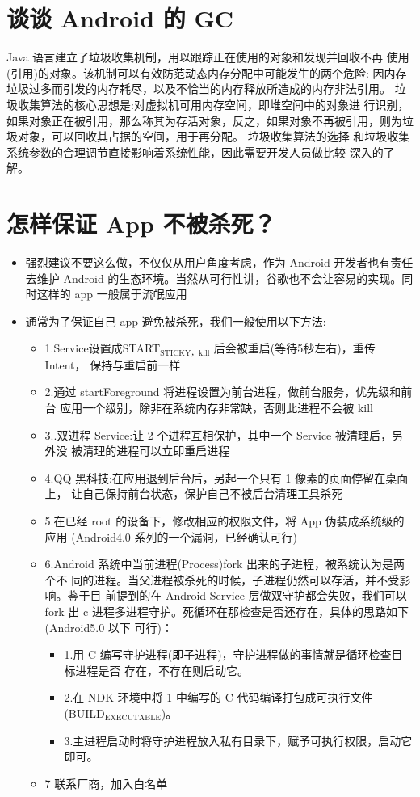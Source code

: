 \documentclass[9pt, b5paper]{article}
\begin{document}
\section{谈谈 Android 的 GC}
\label{sec-13}
Java 语言建立了垃圾收集机制，用以跟踪正在使用的对象和发现并回收不再 使用(引用)的对象。该机制可以有效防范动态内存分配中可能发生的两个危险: 因内存垃圾过多而引发的内存耗尽，以及不恰当的内存释放所造成的内存非法引用。
垃圾收集算法的核心思想是:对虚拟机可用内存空间，即堆空间中的对象进 行识别，如果对象正在被引用，那么称其为存活对象，反之，如果对象不再被引用，则为垃圾对象，可以回收其占据的空间，用于再分配。
垃圾收集算法的选择 和垃圾收集系统参数的合理调节直接影响着系统性能，因此需要开发人员做比较 深入的了解。
\section{怎样保证 App 不被杀死？}
\label{sec-14}
\begin{itemize}
\item 强烈建议不要这么做，不仅仅从用户角度考虑，作为 Android 开发者也有责任去维护 Android 的生态环境。当然从可行性讲，谷歌也不会让容易的实现。同 时这样的 app 一般属于流氓应用
\item 通常为了保证自己 app 避免被杀死，我们一般使用以下方法:
\begin{itemize}
\item 1.Service设置成START$_{\text{STICKY，kill}}$ 后会被重启(等待5秒左右)，重传Intent， 保持与重启前一样
\item 2.通过 startForeground 将进程设置为前台进程，做前台服务，优先级和前台 应用一个级别，除非在系统内存非常缺，否则此进程不会被 kill
\item 3..双进程 Service:让 2 个进程互相保护，其中一个 Service 被清理后，另外没 被清理的进程可以立即重启进程
\item 4.QQ 黑科技:在应用退到后台后，另起一个只有 1 像素的页面停留在桌面上， 让自己保持前台状态，保护自己不被后台清理工具杀死
\item 5.在已经 root 的设备下，修改相应的权限文件，将 App 伪装成系统级的应用 (Android4.0 系列的一个漏洞，已经确认可行)
\item 6.Android 系统中当前进程(Process)fork 出来的子进程，被系统认为是两个不 同的进程。当父进程被杀死的时候，子进程仍然可以存活，并不受影响。鉴于目 前提到的在 Android-Service 层做双守护都会失败，我们可以 fork 出 c 进程多进程守护。死循环在那检查是否还存在，具体的思路如下(Android5.0 以下 可行)：
\begin{itemize}
\item 1.用 C 编写守护进程(即子进程)，守护进程做的事情就是循环检查目标进程是否 存在，不存在则启动它。
\item 2.在 NDK 环境中将 1 中编写的 C 代码编译打包成可执行文件 (BUILD$_{\text{EXECUTABLE}}$)。
\item 3.主进程启动时将守护进程放入私有目录下，赋予可执行权限，启动它即可。
\end{itemize}
\item 7 联系厂商，加入白名单
\end{itemize}
\end{itemize}
\end{document}
